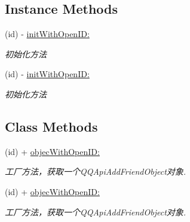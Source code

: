 \subsection*{Instance Methods}
\begin{DoxyCompactItemize}
\item 
\mbox{\label{interface_q_q_api_add_friend_object_aebbfa850cd6731f2ff36ea1489a002ca}} 
(id) -\/ \mbox{\hyperlink{interface_q_q_api_add_friend_object_aebbfa850cd6731f2ff36ea1489a002ca}{init\+With\+Open\+I\+D\+:}}
\begin{DoxyCompactList}\small\item\em 初始化方法 \end{DoxyCompactList}\item 
\mbox{\label{interface_q_q_api_add_friend_object_aebbfa850cd6731f2ff36ea1489a002ca}} 
(id) -\/ \mbox{\hyperlink{interface_q_q_api_add_friend_object_aebbfa850cd6731f2ff36ea1489a002ca}{init\+With\+Open\+I\+D\+:}}
\begin{DoxyCompactList}\small\item\em 初始化方法 \end{DoxyCompactList}\end{DoxyCompactItemize}
\subsection*{Class Methods}
\begin{DoxyCompactItemize}
\item 
\mbox{\label{interface_q_q_api_add_friend_object_a3b59802b641ebec6dd2907d85edb843b}} 
(id) + \mbox{\hyperlink{interface_q_q_api_add_friend_object_a3b59802b641ebec6dd2907d85edb843b}{objec\+With\+Open\+I\+D\+:}}
\begin{DoxyCompactList}\small\item\em 工厂方法，获取一个\+Q\+Q\+Api\+Add\+Friend\+Object对象. \end{DoxyCompactList}\item 
\mbox{\label{interface_q_q_api_add_friend_object_a3b59802b641ebec6dd2907d85edb843b}} 
(id) + \mbox{\hyperlink{interface_q_q_api_add_friend_object_a3b59802b641ebec6dd2907d85edb843b}{objec\+With\+Open\+I\+D\+:}}
\begin{DoxyCompactList}\small\item\em 工厂方法，获取一个\+Q\+Q\+Api\+Add\+Friend\+Object对象. \end{DoxyCompactList}\end{DoxyCompactItemize}

